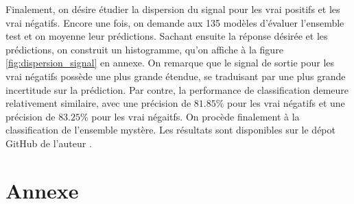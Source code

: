 \documentclass{article}
\begin{document}
Finalement, on désire étudier la dispersion du signal pour les vrai positifs et les vrai négatifs. Encore une fois, on demande aux 135 modèles d'évaluer l'ensemble test et on moyenne leur prédictions. Sachant ensuite la réponse désirée et les prédictions, on construit un histogramme, qu'on affiche à la figure \ref{fig:dispersion_signal} en annexe. On remarque que le signal de sortie pour les vrai négatifs possède une plus grande étendue, se traduisant par une plus grande incertitude sur la prédiction. Par contre, la performance de classification demeure relativement similaire, avec une précision de $81.85\%$ pour les vrai négatifs et une précision de  $83.25\%$ pour les vrai négaitfs. On procède finalement à la classification de l'ensemble mystère. Les résultats sont disponibles sur le dépot GitHub de l'auteur \cite{github}.

\pagebreak

\section{Annexe}
\end{document}

